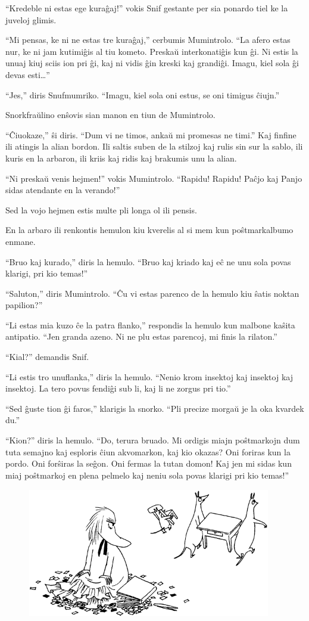 ``Kredeble ni estas ege kuraĝaj!'' vokis Snif gestante per sia ponardo tiel ke la juveloj glimis.

``Mi pensas, ke ni ne estas tre kuraĝaj,'' cerbumis Mumintrolo. ``La afero estas nur, ke ni jam kutimiĝis al tiu kometo. Preskaŭ interkonatiĝis kun ĝi. Ni estis la unuaj kiuj sciis ion pri ĝi, kaj ni vidis ĝin kreski kaj grandiĝi. Imagu, kiel sola ĝi devas esti{\ldots}''

``Jes,'' diris Snufmumriko. ``Imagu, kiel sola oni estus, se oni timigus ĉiujn.''

Snorkfraŭlino enŝovis sian manon en tiun de Mumintrolo.

``Ĉiuokaze,'' ŝi diris. ``Dum vi ne timos, ankaŭ mi promesas ne timi.''
\sectionbreak
Kaj finfine ili atingis la alian bordon. Ili saltis suben de la stilzoj kaj rulis sin sur la sablo, ili kuris en la arbaron, ili kriis kaj ridis kaj brakumis unu la alian.

``Ni preskaŭ venis hejmen!'' vokis Mumintrolo. ``Rapidu! Rapidu! Paĉjo kaj Panjo sidas atendante en la verando!''

Sed la vojo hejmen estis multe pli longa ol ili pensis.

En la arbaro ili renkontis hemulon kiu kverelis al si mem kun poŝtmarkalbumo enmane.

``Bruo kaj kurado,'' diris la hemulo. ``Bruo kaj kriado kaj eĉ ne unu sola povas klarigi, pri kio temas!''

``Saluton,'' diris Mumintrolo. ``Ĉu vi estas parenco de la hemulo kiu ŝatis noktan papilion?''

``Li estas mia kuzo ĉe la patra flanko,'' respondis la hemulo kun malbone kaŝita antipatio. ``Jen granda azeno. Ni ne plu estas parencoj, mi finis la rilaton.''

``Kial?'' demandis Snif.

``Li estis tro unuflanka,'' diris la hemulo. ``Nenio krom insektoj kaj insektoj kaj insektoj. La tero povus fendiĝi sub li, kaj li ne zorgus pri tio.''

``Sed ĝuste tion ĝi faros,'' klarigis la snorko. ``Pli precize morgaŭ je la oka kvardek du.''

``Kion?'' diris la hemulo. ``Do, terura bruado. Mi ordigis miajn poŝtmarkojn dum tuta semajno kaj esploris ĉiun akvomarkon, kaj kio okazas? Oni foriras kun la pordo. Oni forŝiras la seĝon. Oni fermas la tutan domon! Kaj jen mi sidas kun miaj poŝtmarkoj en plena pelmelo kaj neniu sola povas klarigi pri kio temas!''

\begin{figure}[htbp]
\centering
\includegraphics[width=301pt,height=160pt]{8-3.png}
\caption{}
\label{8-3}
\end{figure}

